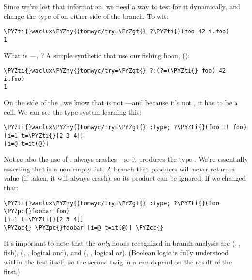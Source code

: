 Since we've lost that information, we need a way to test for it
dynamically, and change the type of  on either side of the
branch.  To wit:

\begin{framed_shaded}
\begin{Verbatim}[fontsize=\relsize{-2.5},fontseries=b,commandchars=\\\{\}]
\PYZti{}waclux\PYZhy{}tomwyc/try=\PYZgt{} ?\PYZti{}(foo 42 i.foo)
1
\end{Verbatim}
\end{framed_shaded}
What is ---, ?  A simple synthetic that
use our fishing hoon,  ():

\begin{framed_shaded}
\begin{Verbatim}[fontsize=\relsize{-2.5},fontseries=b,commandchars=\\\{\}]
\PYZti{}waclux\PYZhy{}tomwyc/try=\PYZgt{} ?:(?=(\PYZti{} foo) 42 i.foo)
1
\end{Verbatim}
\end{framed_shaded}
On the \kode{\textbar{}} side of the , we know that  is not \kode{\sig }---and because it's not \kode{\sig }, it has to be a cell.  We can see the
type system learning this: 

\begin{framed_shaded}
\begin{Verbatim}[fontsize=\relsize{-2.5},fontseries=b,commandchars=\\\{\}]
\PYZti{}waclux\PYZhy{}tomwyc/try=\PYZgt{} :type; ?\PYZti{}(foo !! foo)
[i=1 t=\PYZti{}[2 3 4]]
[i=@ t=it(@)]
\end{Verbatim}
\end{framed_shaded}
Notice also the use of \kode{!!}.  \kode{!!} always crashes---so it
produces the type .  We're essentially asserting that
 is a non-empty list.   A branch that produces  will
never return a value (if taken, it will always crash), so its
product can be ignored.  If we changed that:

\begin{framed_shaded}
\begin{Verbatim}[fontsize=\relsize{-2.5},fontseries=b,commandchars=\\\{\}]
\PYZti{}waclux\PYZhy{}tomwyc/try=\PYZgt{} :type; ?\PYZti{}(foo \PYZpc{}foobar foo)
[i=1 t=\PYZti{}[2 3 4]]
\PYZob{} \PYZpc{}foobar [i=@ t=it(@)] \PYZcb{}
\end{Verbatim}
\end{framed_shaded}
It's important to note that the \emph{only} hoons recognized in branch
analysis are  (, , fish),  (,
, logical and), and  (, , logical or).
(Boolean logic is fully understood within the test itself, so the
second twig in a  can depend on the result of the first.)

